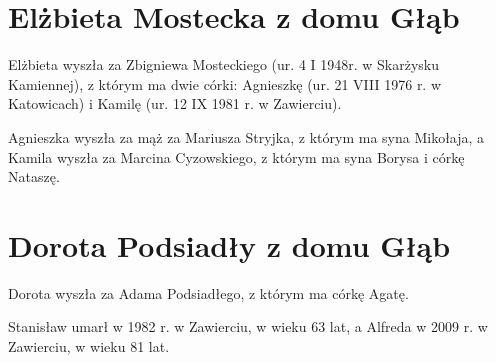 \section{Elżbieta Mostecka z domu Głąb}

Elżbieta wyszła za Zbigniewa Mosteckiego (ur. 4 I 1948r. w Skarżysku Kamiennej), z którym ma dwie córki: Agnieszkę (ur. 21 VIII 1976 r. w Katowicach) i Kamilę (ur. 12 IX 1981 r. w Zawierciu).

Agnieszka wyszła za mąż za Mariusza Stryjka, z którym ma syna Mikołaja, a Kamila wyszła za Marcina Cyzowskiego, z którym ma syna Borysa i córkę Nataszę.




\section{Dorota Podsiadły z domu Głąb}

Dorota wyszła za Adama Podsiadłego, z którym ma córkę Agatę.

Stanisław umarł w 1982 r. w Zawierciu, w wieku 63 lat, a Alfreda w 2009 r. w Zawierciu, w wieku 81 lat.



